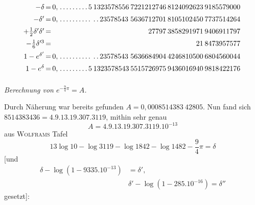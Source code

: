 \begingroup\footnotesize\setlength{\arraycolsep}{1pt}\renewcommand{\arraystretch}{1.12}\[
\begin{array}{r@{\,=\,}r@{\;}l@{\hspace{2pt}}l@{\hspace{2pt}}l@{\hspace{2pt}}l@{\hspace{2pt}}l@{\hspace{2pt}}l}
-\delta & 0{,} & .\,.\,.\,.\,.\,.\,.\,.\,.\,5 & 1323578556 & 7221212746 & 8124092623 & 9185579000 & \\[5pt]
-\delta' & 0{,} & .\,.\,.\,.\,.\,.\,.\,.\,.\,. & .\,.\,23578543 & 5636712701 & 8105102450 & 7737514264 & \\[5pt]
+\tfrac12\delta'\delta' &  &  &  & \phantom{00000}27797 & 3858291971 & 9406911797 & \\[5pt]
-\tfrac16\delta^{\prime3} &  &  &  &  & \phantom{00000000}21 & 8473957577 & \\[5pt]
1-e^{\delta'} & 0{,} & .\,.\,.\,.\,.\,.\,.\,.\,.\,. & .\,.\,23578543 & 5636684904 & 4246810500 & 6804560044 & \\[5pt]
1-e^\delta & 0{,} & .\,.\,.\,.\,.\,.\,.\,.\,.\,5 & 1323578543 & 5515726975 & 9436016940 & 9818422176 & \\[5pt]
\end{array}
\]\endgroup

\par{}

\begin{center}\emph{Berechnung von $e^{-\frac94\pi}=A$.}\end{center}

Durch Näherung war bereits gefunden $A=0{,}0008514383\ 42805$. Nun fand sich
$8514383436=4.9.13.19.307.3119$, mithin sehr genau
\[
A=4.9.13.19.307.3119.10^{-13}
\]
aus \textsc{Wolframs} Tafel
\[
13\log10-\log3119-\log1842-\log1482-\frac94\pi=\delta
\]
[und
\[
\begin{aligned}\delta-\log(1-9335.10^{-13})&=\delta',\\[7pt]&
\delta'-\log(1-285.10^{-16})=\delta''\end{aligned}
\]
gesetzt]:

